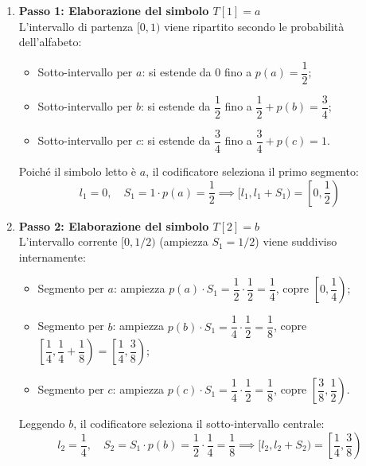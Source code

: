 \begin{enumerate}
  \item \textbf{Passo 1: Elaborazione del simbolo $T[1] = a$}\\
  L'intervallo di partenza $[0, 1)$ viene ripartito secondo le probabilit\`a dell'alfabeto:
  \begin{itemize}
    \item Sotto-intervallo per $a$: si estende da $0$ fino a $p(a) = \dfrac{1}{2}$;
    \item Sotto-intervallo per $b$: si estende da $\dfrac{1}{2}$ fino a $\dfrac{1}{2} + p(b) = \dfrac{3}{4}$;
    \item Sotto-intervallo per $c$: si estende da $\dfrac{3}{4}$ fino a $\dfrac{3}{4} + p(c) = 1$.
  \end{itemize}
  Poich\'e il simbolo letto \`e $a$, il codificatore seleziona il primo segmento:
  \begin{equation}
    l_1 = 0, \quad S_1 = 1 \cdot p(a) = \frac{1}{2} \implies [l_1, l_1 + S_1) = \left[0, \frac{1}{2}\right)
  \end{equation}

  \item \textbf{Passo 2: Elaborazione del simbolo $T[2] = b$}\\
  L'intervallo corrente $[0, 1/2)$ (ampiezza $S_1 = 1/2$) viene suddiviso internamente:
  \begin{itemize}
    \item Segmento per $a$: ampiezza $p(a) \cdot S_1 = \dfrac{1}{2} \cdot \dfrac{1}{2} = \dfrac{1}{4}$, copre $\left[0, \dfrac{1}{4}\right)$;
    \item Segmento per $b$: ampiezza $p(b) \cdot S_1 = \dfrac{1}{4} \cdot \dfrac{1}{2} = \dfrac{1}{8}$, copre $\left[\dfrac{1}{4}, \dfrac{1}{4} + \dfrac{1}{8}\right) = \left[\dfrac{1}{4}, \dfrac{3}{8}\right)$;
    \item Segmento per $c$: ampiezza $p(c) \cdot S_1 = \dfrac{1}{4} \cdot \dfrac{1}{2} = \dfrac{1}{8}$, copre $\left[\dfrac{3}{8}, \dfrac{1}{2}\right)$.
  \end{itemize}
  Leggendo $b$, il codificatore seleziona il sotto-intervallo centrale:
  \begin{equation}
    l_2 = \frac{1}{4}, \quad S_2 = S_1 \cdot p(b) = \frac{1}{2} \cdot \frac{1}{4} = \frac{1}{8} \implies [l_2, l_2 + S_2) = \left[\frac{1}{4}, \frac{3}{8}\right)
  \end{equation}


\end{enumerate}
